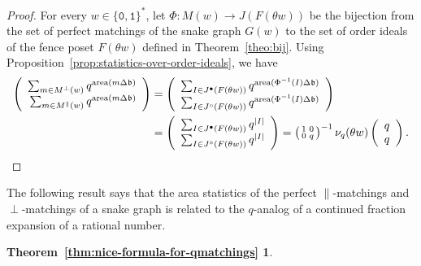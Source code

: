 \documentclass[a4paper,12pt]{amsart}
\newtheorem*{THEOREMD}{Theorem~\ref{thm:nice-formula-for-qmatchings}}
\newcommand{\bfrak}{{\mathfrak{b}}}
\newcommand{\0}{\mathtt{0}}
\newcommand{\1}{\mathtt{1}}
\newcommand{\2}{\mathtt{2}}
\newcommand{\3}{\mathtt{3}}
\newcommand{\carreplein}{{\perp}}
\newcommand{\carrevide}{{\parallel}}
\DeclareMathOperator{\area}{area}
\newcommand{\size}[1]{
    {|#1|}                 %
}
\begin{document}
\begin{proof}
    For every $w\in\{\0,\1\}^*$,
    let
    $\Phi:M(w)\to J(F(\theta w))$ be the bijection from
    the set of perfect matchings of the snake graph $G(w)$
    to the set of order ideals of the fence poset $F(\theta w)$
defined in Theorem~\ref{theo:bij}.
Using Proposition~\ref{prop:statistics-over-order-ideals},
we have
\begin{align*}
    \left(\begin{array}{r}
        \sum_{m\in M^\carreplein(w)} q^{\area(m\Delta\bfrak)}\\
        \sum_{m\in M^\carrevide(w)}  q^{\area(m\Delta\bfrak)}
    \end{array}\right)
    &=
    \left(\begin{array}{r}
            \sum_{I\in J^\bullet(F(\theta w))} q^{\area(\Phi^{-1}(I)\Delta\bfrak)}\\
            \sum_{I\in J^\circ  (F(\theta w))} q^{\area(\Phi^{-1}(I)\Delta\bfrak)}
    \end{array}\right)\\
    &=
    \left(\begin{array}{r}
          \sum_{I\in J^\bullet(F(\theta w))} q^{\size{I}}\\
          \sum_{I\in J^\circ  (F(\theta w))} q^{\size{I}}
    \end{array}\right)%
    =
    \left(\begin{smallmatrix} 1 & 0 \\ 0 & q \end{smallmatrix}\right)^{-1}
            \nu_q(\theta w)
        \left(\begin{array}{c} q \\ q \end{array}\right).
\end{align*}
\end{proof}

    The following result says that the area statistics of the perfect
    $\carrevide$-matchings
    and $\carreplein$-matchings
    of a snake graph is related
    to the $q$-analog of a continued fraction expansion of a rational number.

\begin{THEOREMD}
    \MainTheoremD
\end{THEOREMD}
\end{document}
